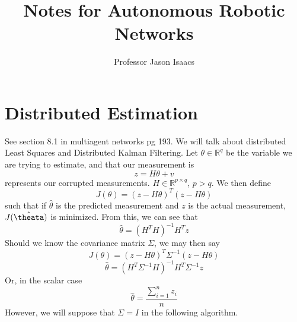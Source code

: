 \documentclass{article}
\title{Notes for Autonomous Robotic Networks}
\author{Professor Jason Isaacs}
\date{}
\begin{document}
\maketitle
\section{Distributed Estimation}
See section 8.1 in multiagent networks pg 193. 
We will talk about distributed Least Squares and Distributed Kalman Filtering. 
Let $\theta \in \mathbb{R}^q$ be the variable we are trying to estimate, and that our measurement is
\[ z  = H\theta + v \]
represents our corrupted measurements. $H \in \mathbb{R}^{p \times q}$, $p > q$.
We then define
\[ J(\theta) = (z - H\theta)^{T} (z - H\theta) \]
such that if $\hat{\theta}$ is the predicted measurement and $z$ is the actual
measurement, $J(\hat{\theata})$ is minimized. From this, we can see that
\[ \hat{\theta} = (H^TH)^{-1}H^T z \]
Should we know the covariance matrix $\Sigma$, we may then say
\[ J(\theta) = (z - H\theta)^{T} \Sigma^{-1} (z - H\theta) \]
\[ \hat{\theta} = (H^T \Sigma^{-1} H)^{-1}H^T\Sigma^{-1} z \]
Or, in the scalar case
\[ \hat{\theta} = \frac{\sum_{i = 1}^n z_i}{n} \]
However, we will suppose that $\Sigma = I$ in the following algorithm.
\end{document}

